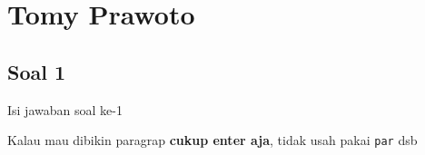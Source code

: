 \section{Tomy Prawoto}
\subsection{Soal 1}
Isi jawaban soal ke-1

Kalau mau dibikin paragrap \textbf{cukup enter aja}, tidak usah pakai \verb|par| dsb


